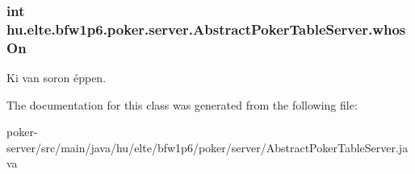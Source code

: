 \subsubsection[{whos\+On}]{\setlength{\rightskip}{0pt plus 5cm}int hu.\+elte.\+bfw1p6.\+poker.\+server.\+Abstract\+Poker\+Table\+Server.\+whos\+On\hspace{0.3cm}{\ttfamily [protected]}}\label{classhu_1_1elte_1_1bfw1p6_1_1poker_1_1server_1_1_abstract_poker_table_server_ac4b4b5f5ec9dfa6337b54008362895a9}
Ki van soron éppen. 

The documentation for this class was generated from the following file\+:\begin{DoxyCompactItemize}
\item 
poker-\/server/src/main/java/hu/elte/bfw1p6/poker/server/Abstract\+Poker\+Table\+Server.\+java\end{DoxyCompactItemize}
